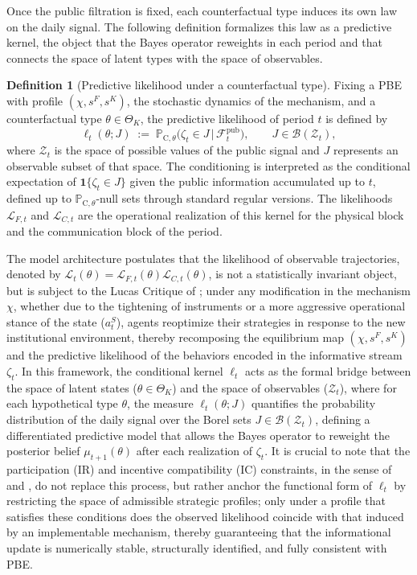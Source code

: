 \documentclass[ecta,nameyear,draft]{econsocart}
\theoremstyle{plain}
\theoremstyle{definition}
\newtheorem{definition}[theorem]{Definition}
\newcommand{\ProbC}[1]{\mathbb{P}_{\mathrm{C},#1}}
\newcommand{\ThetaK}{\Theta_K}
\newcommand{\1}{\mathbf{1}}
\begin{document}
Once the public filtration is fixed, each counterfactual type induces its own law on the daily signal. The following definition formalizes this law as a predictive kernel, the object that the Bayes operator reweights in each period and that connects the space of latent types with the space of observables.

\begin{definition}[Predictive likelihood under a counterfactual type]\label{def:predictive-likelihood}
Fixing a PBE with profile $(\chi,s^F,s^K)$, the stochastic dynamics of the mechanism, and a counterfactual type $\theta\in\ThetaK$, the predictive likelihood of period $t$ is defined by
\begin{equation}
\label{eq:likelihood-zeta}
\ell_t(\theta;J)\;:=\;\ProbC{\theta}\bigl(\zeta_t \in J \,\big|\, \mathcal{F}_t^{\mathrm{pub}}\bigr),
\qquad J\in\mathcal{B}(\mathcal{Z}_t),
\end{equation}
where $\mathcal{Z}_t$ is the space of possible values of the public signal and $J$ represents an observable subset of that space. The conditioning is interpreted as the conditional expectation of $\mathbf{1}\{\zeta_t\in J\}$ given the public information accumulated up to $t$, defined up to $\ProbC{\theta}$-null sets through standard regular versions. The likelihoods $\mathcal{L}_{F,t}$ and $\mathcal{L}_{C,t}$ are the operational realization of this kernel for the physical block and the communication block of the period.
\end{definition}

The model architecture postulates that the likelihood of observable trajectories, denoted by $\mathcal{L}_t(\theta)=\mathcal{L}_{F,t}(\theta)\mathcal{L}_{C,t}(\theta)$, is not a statistically invariant object, but is subject to the Lucas Critique of \citet{Lucas1976}; under any modification in the mechanism $\chi$, whether due to the tightening of instruments or a more aggressive operational stance of the state ($a_t^S$), agents reoptimize their strategies in response to the new institutional environment, thereby recomposing the equilibrium map $(\chi, s^F, s^K)$ and the predictive likelihood of the behaviors encoded in the informative stream $\zeta_t$. In this framework, the conditional kernel $\ell_t$ acts as the formal bridge between the space of latent states ($\theta \in \ThetaK$) and the space of observables ($\mathcal{Z}_t$), where for each hypothetical type $\theta$, the measure $\ell_t(\theta; J)$ quantifies the probability distribution of the daily signal over the Borel sets $J \in \mathcal{B}(\mathcal{Z}_t)$, defining a differentiated predictive model that allows the Bayes operator to reweight the posterior belief $\mu_{t+1}(\theta)$ after each realization of $\zeta_t$. It is crucial to note that the participation (IR) and incentive compatibility (IC) constraints, in the sense of \citet{Myerson1979IC} and \citet{BoltonDewatripont2005}, do not replace this process, but rather anchor the functional form of $\ell_t$ by restricting the space of admissible strategic profiles; only under a profile that satisfies these conditions does the observed likelihood coincide with that induced by an implementable mechanism, thereby guaranteeing that the informational update is numerically stable, structurally identified, and fully consistent with PBE.
\end{document}
